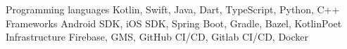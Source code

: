 \documentclass[10pt]{ms-cv}
\begin{document}
%
%
%
%



\makecvheader

\begin{cvskills}
    \cvskill
        {Programming languages}
        {Kotlin, Swift, Java, Dart, TypeScript, Python, C++}
    \cvskill
        {Frameworks} 
        {Android SDK, iOS SDK, Spring Boot, Gradle, Bazel, KotlinPoet}
    \cvskill
        {Infrastructure}
        {Firebase, GMS, GitHub CI/CD, Gitlab CI/CD, Docker}
\end{cvskills}
\end{document}
